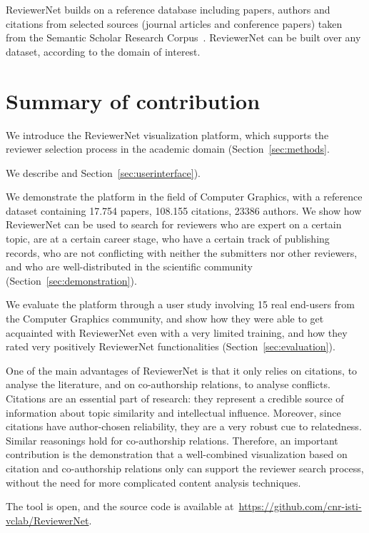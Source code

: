 ReviewerNet builds on a reference database including papers, authors and citations from selected sources (journal articles and conference papers) taken from the Semantic Scholar Research Corpus~\cite{ammar:18}. ReviewerNet can be built over any dataset, according to the domain of interest.

\section{Summary of contribution}

We introduce the ReviewerNet visualization platform, which supports the reviewer selection process in the academic domain (Section~\ref{sec:methods}.

We describe and Section~\ref{sec:userinterface}). 

We demonstrate the platform in the field of Computer Graphics, with a reference dataset containing 17.754 papers, 108.155 citations, 23386 authors. We show how ReviewerNet can be used to search for reviewers who are expert on a certain topic, are at a certain career stage, who have a certain track of publishing records, who are not conflicting with neither the submitters nor other reviewers, and who are well-distributed in the scientific community (Section~\ref{sec:demonstration}). 

We evaluate the platform through a user study involving 15 real end-users from the Computer Graphics community, and show how they were able to get acquainted with ReviewerNet even with a very limited training, and how they rated very positively ReviewerNet functionalities (Section~\ref{sec:evaluation}).  

One of the main advantages of ReviewerNet is that it only relies on citations, to analyse the literature, and on co-authorship relations, to analyse conflicts. Citations are an essential part of research: they represent a credible source of information about topic similarity and intellectual influence. Moreover, since citations have author-chosen reliability, they are a very robust cue to relatedness. Similar reasonings hold for co-authorship relations. Therefore, an important contribution is the demonstration that a well-combined visualization based on citation and co-authorship relations only can support the reviewer search process, without the need for more complicated content analysis techniques.  

The tool is open, and the source code is available at~\url{https://github.com/cnr-isti-vclab/ReviewerNet}.  




